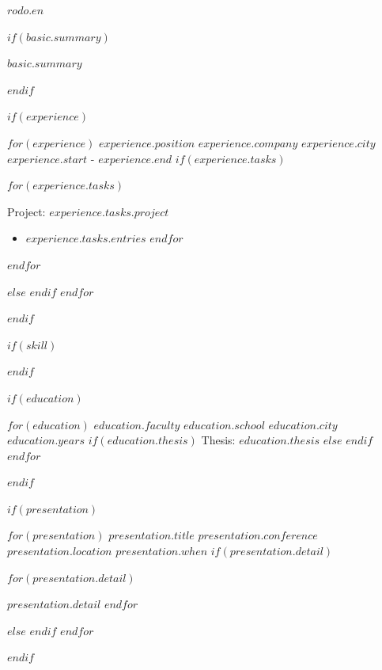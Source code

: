 \documentclass[$fontSize$, $format$]{awesome-cv}
\begin{document}
\makecvheader
\makecvfooter
  {$rodo.en$}
  {}
  {\thepage}

$if(basic.summary)$
\par
\begin{cvparagraph}
$basic.summary$
\end{cvparagraph}
$endif$

$if(experience)$
\begin{cventries}
    $for(experience)$
    \cventry
    {$experience.position$}
    {$experience.company$}
    {$experience.city$}
    {$experience.start$ - $experience.end$}
    $if(experience.tasks)$
    {
        \begin{cvitems}
            $for(experience.tasks)$
            \item[]{
                \begin{scriptsize}Project: \textit{$experience.tasks.project$}\end{scriptsize}
                \begin{itemize}
                    $for(experience.tasks.entries)$
                    \item $experience.tasks.entries$
                    $endfor$
                \end{itemize}
            }
            $endfor$
        \end{cvitems}
        \vspace{5pt}
    }
    $else$
    {}
    $endif$
    $endfor$
\end{cventries}
$endif$

$if(skill)$
$endif$

$if(education)$
\begin{cventries}
    $for(education)$
    \cventry
    {$education.faculty$}
    {$education.school$}
    {$education.city$}
    {$education.years$}
    $if(education.thesis)$
    {Thesis: \textit{$education.thesis$}}
    $else$
    {}
    $endif$
    \vspace{5pt}
    $endfor$
\end{cventries}
$endif$

$if(presentation)$
\begin{cventries}
    $for(presentation)$
    \cventry
        {$presentation.title$}
        {$presentation.conference$}
        {$presentation.location$}
        {$presentation.when$}
        $if(presentation.detail)$
        {
            \begin{cvitems}
            $for(presentation.detail)$
                \item{$presentation.detail$}
            $endfor$
            \end{cvitems}
        }
        $else$
        {}
        $endif$
    $endfor$
\end{cventries}
$endif$
\end{document}
